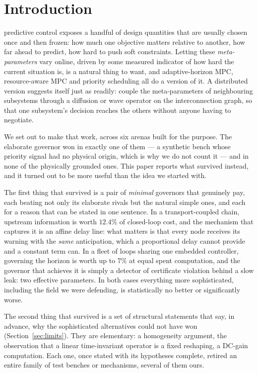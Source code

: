 \documentclass[journal]{IEEEtran}
\theoremstyle{definition}
\begin{document}
\section{Introduction}
 predictive control exposes a handful of design
quantities that are usually chosen once and then frozen: how much one objective
matters relative to another, how far ahead to predict, how hard to push soft
constraints. Letting these \emph{meta-parameters} vary online, driven by some
measured indicator of how hard the current situation is, is a natural thing to
want, and adaptive-horizon MPC, resource-aware MPC and priority scheduling all
do a version of it. A distributed version suggests itself just as readily:
couple the meta-parameters of neighbouring subsystems through a diffusion or
wave operator on the interconnection graph, so that one subsystem's decision
reaches the others without anyone having to negotiate.

We set out to make that work, across six arenas built for the purpose. The
elaborate governor won in exactly one of them --- a synthetic bench whose
priority signal had no physical origin, which is why we do not count it --- and
in none of the physically grounded ones. This paper reports what survived
instead, and it turned out to be more useful than the idea we started with.

The first thing that survived is a pair of \emph{minimal} governors that
genuinely pay, each beating not only its elaborate rivals but the natural
simple ones, and each for a reason that can be stated in one sentence. In a
transport-coupled chain, upstream information is worth $12.4\%$ of closed-loop
cost, and the mechanism that captures it is an affine delay line: what matters
is that every node receives its warning with the \emph{same} anticipation,
which a proportional delay cannot provide and a constant term can. In a fleet
of loops sharing one embedded controller, governing the horizon is worth up to
$7\%$ at equal spent computation, and the governor that achieves it is
simply a detector of certificate violation behind a slow leak: two effective
parameters. In both cases everything more sophisticated, including the field we
were defending, is statistically no better or significantly worse.

The second thing that survived is a set of structural statements that say, in
advance, why the sophisticated alternatives could not have won
(Section~\ref{sec:limits}). They are elementary: a homogeneity argument, the observation that a linear
time-invariant operator is a fixed reshaping, a DC-gain computation. Each one,
once stated with its hypotheses complete, retired an entire family of test
benches or mechanisms, several of them ours.
\end{document}
